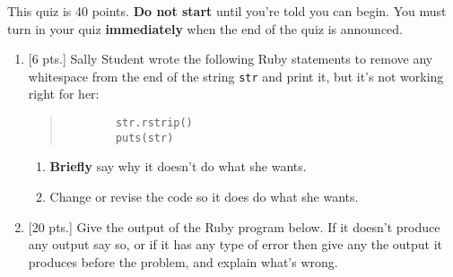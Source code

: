 \documentclass[10pt]{article}
\begin{document}
  \hspace{\fill}%
  \nameblock

  \smallskip


  \vspace{-3mm}

    \noindent
    This quiz is 40 points.  \textbf{Do not start} until you're told you can
  begin.  You must turn in your quiz \textbf{immediately} when the end of
  the quiz is announced.

  \vspace{-2mm}

  \begin{enumerate}

    \addtolength{\itemsep}{16mm}

    \item {[6 pts.]} Sally Student wrote the following Ruby statements to
          remove any whitespace from the end of the string \texttt{str} and
          print it, but it's not working right for her:

          \vspace{-2.5mm}

          \begin{quote}

            \begin{Verbatim}
        str.rstrip()
        puts(str)
            \end{Verbatim}

          \end{quote}

          \begin{enumerate}

            \addtolength{\itemsep}{16mm}

            \item \textbf{Briefly} say why it doesn't do what she wants.

            \item Change or revise the code so it does do what she wants.

                  \vspace{4mm}

          \end{enumerate}

          \vspace{-2.5mm}

    \item {[20 pts.]} Give the output of the Ruby program below.  If it
          doesn't produce any output say so, or if it has any type of error
          then give any the output it produces before the problem, and
          explain what's wrong.


\end{enumerate}
\end{document}
